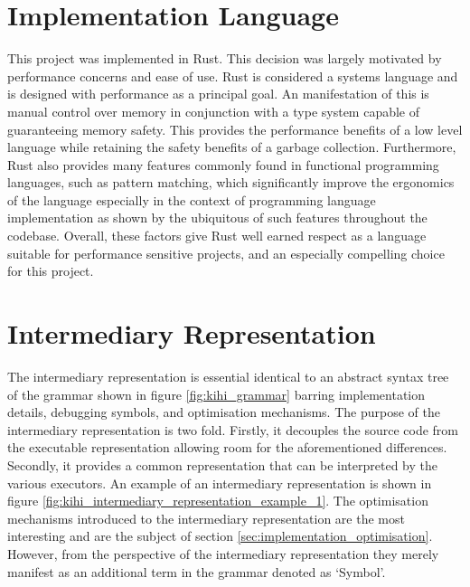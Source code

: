 
\section{Implementation Language}
This project was implemented in Rust. This decision was largely motivated by performance concerns and ease of use. Rust is considered a systems language and is designed with performance as a principal goal. An manifestation of this is manual control over memory in conjunction with a type system capable of guaranteeing memory safety. This provides the performance benefits of a low level language while retaining the safety benefits of a garbage collection. Furthermore, Rust also provides many features commonly found in functional programming languages, such as pattern matching, which significantly improve the ergonomics of the language especially in the context of programming language implementation as shown by the ubiquitous of such features throughout the codebase. Overall, these factors give Rust well earned respect as a language suitable for performance sensitive projects, and an especially compelling choice for this project.


\section{Intermediary Representation}\label{sec:implementation_intermediary_representation}
The intermediary representation is essential identical to an abstract syntax tree of the grammar shown in figure \ref{fig:kihi_grammar} barring implementation details, debugging symbols, and optimisation mechanisms. The purpose of the intermediary representation is two fold. Firstly, it decouples the source code from the executable representation allowing room for the aforementioned differences. Secondly, it provides a common representation that can be interpreted by the various executors. An example of an intermediary representation is shown in figure \ref{fig:kihi_intermediary_representation_example_1}. The optimisation mechanisms introduced to the intermediary representation are the most interesting and are the subject of section \ref{sec:implementation_optimisation}. However, from the perspective of the intermediary representation they merely manifest as an additional term in the grammar denoted as `Symbol'.

